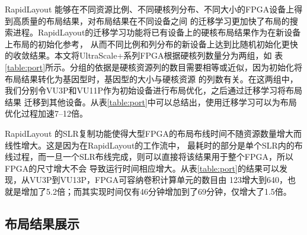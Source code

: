 RapidLayout 能够在不同资源比例、不同硬核列分布、不同大小的FPGA设备上得到高质量的布局结果，对布局结果在不同设备之间
的迁移学习更加快了布局的搜索进程。RapidLayout的迁移学习功能将已有设备上的硬核布局结果作为在新设备上布局的初始化参考，
从而不同比例和列分布的新设备上达到比随机初始化更快的收敛结果。本文将UltraScale+系列FPGA根据硬核列数量分为两组，如
表\ref{table:port}所示。分组的依据是硬核资源列的数目需要相等或近似，因为初始化将布局结果转化为基因型时，基因型的大小与硬核资源
的列数有关。在这两组中，我们分别令VU3P和VU11P作为初始设备进行布局优化，之后通过迁移学习将布局结果
迁移到其他设备。从表\ref{table:port}中可以总结出，使用迁移学习可以为布局优化过程加速7--12倍。

RapidLayout 的SLR复制功能使得大型FPGA的布局布线时间不随资源数量增大而线性增大。这是因为在RapidLayout的工作流中，
最耗时的部分是单个SLR内的布线过程，而一旦一个SLR布线完成，则可以直接将该结果用于整个FPGA，所以FPGA的尺寸增大不会
导致运行时间相应增大。从表\ref{table:port}的结果可以发现，从VU3P到VU13P，FPGA可容纳卷积计算单元的数目由
123增大到640，也就是增加了5.2倍；而其实现时间仅有46分钟增加到了69分钟，仅增大了1.5倍。

\newpage

\subsection{布局结果展示}

